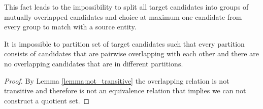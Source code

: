 This fact leads to the impossibility to split all target candidates into groups of mutually
overlapped candidates and choice at maximum one candidate from every group to match with a source entity.
\begin{corollary}
  It is impossible to partition set of target candidates such that every partition consists of
  candidates that are pairwise overlapping with each other and there are no overlapping candidates
  that are in different partitions.
\end{corollary}
\begin{proof}
  By Lemma \ref{lemma:not_transitive} the overlapping relation is not transitive and therefore
  is not an equivalence relation that implies we can not construct a quotient set.
\end{proof}

